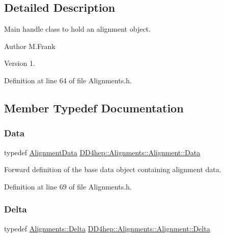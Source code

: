 \subsection{Detailed Description}
Main handle class to hold an alignment object. 

\begin{DoxyAuthor}{Author}
M.\+Frank 
\end{DoxyAuthor}
\begin{DoxyVersion}{Version}
1. 
\end{DoxyVersion}


Definition at line 64 of file Alignments.\+h.



\subsection{Member Typedef Documentation}
\hypertarget{class_d_d4hep_1_1_alignments_1_1_alignment_a5ff6a2c0b838274552fbac2f52b9a652}{}\label{class_d_d4hep_1_1_alignments_1_1_alignment_a5ff6a2c0b838274552fbac2f52b9a652} 
\subsubsection{\texorpdfstring{Data}{Data}}
{\footnotesize\ttfamily typedef \hyperlink{class_d_d4hep_1_1_alignments_1_1_alignment_data}{Alignment\+Data} \hyperlink{class_d_d4hep_1_1_alignments_1_1_alignment_a5ff6a2c0b838274552fbac2f52b9a652}{D\+D4hep\+::\+Alignments\+::\+Alignment\+::\+Data}}



Forward definition of the base data object containing alignment data. 



Definition at line 69 of file Alignments.\+h.

\hypertarget{class_d_d4hep_1_1_alignments_1_1_alignment_a49bf0c4249a3b792bf6a016b1d067f64}{}\label{class_d_d4hep_1_1_alignments_1_1_alignment_a49bf0c4249a3b792bf6a016b1d067f64} 
\subsubsection{\texorpdfstring{Delta}{Delta}}
{\footnotesize\ttfamily typedef \hyperlink{class_d_d4hep_1_1_alignments_1_1_delta}{Alignments\+::\+Delta} \hyperlink{class_d_d4hep_1_1_alignments_1_1_alignment_a49bf0c4249a3b792bf6a016b1d067f64}{D\+D4hep\+::\+Alignments\+::\+Alignment\+::\+Delta}}



